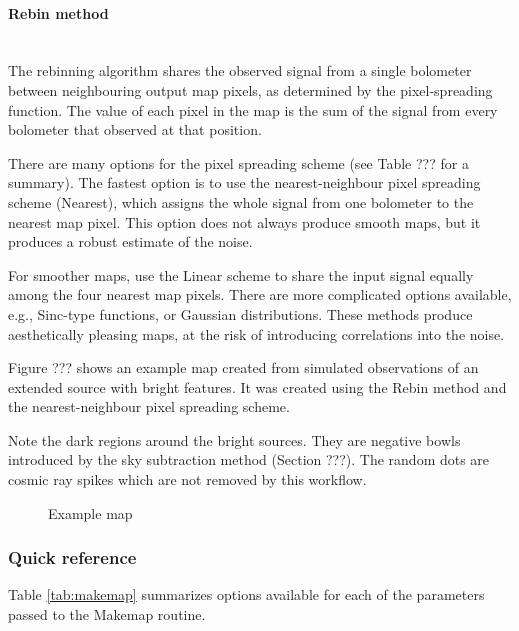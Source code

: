 \documentclass[twoside,11pt]{article}
\newcommand{\xlabel}[1]{}
\renewcommand{\_}{\texttt{\symbol{95}}}
\begin{document}
\paragraph{\xlabel{rebinmap}Rebin method\label{se:rebinmap}} \ \\

The rebinning algorithm shares the observed signal from a single
bolometer between neighbouring output map pixels, as determined by the
pixel-spreading function. The value of each pixel in the map is the
sum of the signal from every bolometer that observed at that position.

There are many options for the pixel spreading scheme (see Table ???
for a summary). The fastest option is to use the nearest-neighbour
pixel spreading scheme (Nearest), which assigns the whole signal from
one bolometer to the nearest map pixel. This option does not always
produce smooth maps, but it produces a robust estimate of the noise.

For smoother maps, use the Linear scheme to share the input signal
equally among the four nearest map pixels. There are more complicated
options available, e.g., Sinc-type functions, or Gaussian
distributions. These methods produce aesthetically pleasing maps, at
the risk of introducing correlations into the noise.

Figure ??? shows an example map created from simulated observations of
an extended source with bright features. It was created using the
Rebin method and the nearest-neighbour pixel spreading scheme.

Note the dark regions around the bright sources. They are negative
bowls introduced by the sky subtraction method (Section ???). The
random dots are cosmic ray spikes which are not removed by this
workflow.

\begin{figure}
\caption{Example map}
\end{figure}


\subsubsection{Quick reference}

Table \ref{tab:makemap} summarizes options available for each of the
parameters passed to the Makemap routine.
\end{document}
